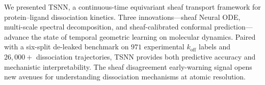 \documentclass{article}
\begin{document}
We presented TSNN, a continuous-time equivariant sheaf transport
framework for protein--ligand dissociation kinetics.  Three
innovations---sheaf Neural ODE, multi-scale spectral decomposition,
and sheaf-calibrated conformal prediction---advance the state of
temporal geometric learning on molecular dynamics.  Paired with a
six-split de-leaked benchmark on $971$ experimental $k_\text{off}$
labels and $26{,}000{+}$ dissociation trajectories, TSNN provides
both predictive accuracy and mechanistic interpretability.
The sheaf disagreement early-warning signal opens new avenues for
understanding dissociation mechanisms at atomic resolution.



\end{document}
